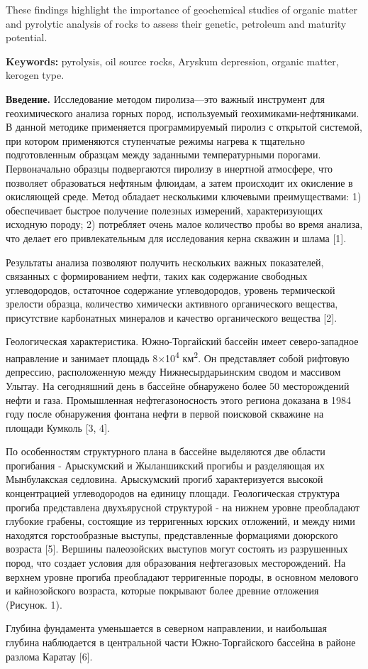 These findings highlight the importance of geochemical studies of
organic matter and pyrolytic analysis of rocks to assess their genetic,
petroleum and maturity potential.

{\bfseries Keywords:} pyrolysis, oil source rocks, Aryskum depression,
organic matter, kerogen type.

\begin{multicols}{2}
{\bfseries Введение.} Исследование методом пиролиза---это важный инструмент
для геохимического анализа горных пород, используемый
геохимиками-нефтяниками. В данной методике применяется программируемый
пиролиз с открытой системой, при котором применяются ступенчатые режимы
нагрева к тщательно подготовленным образцам между заданными
температурными порогами. Первоначально образцы подвергаются пиролизу в
инертной атмосфере, что позволяет образоваться нефтяным флюидам, а затем
происходит их окисление в окисляющей среде. Метод обладает несколькими
ключевыми преимуществами: 1) обеспечивает быстрое получение полезных
измерений, характеризующих исходную породу; 2) потребляет очень малое
количество пробы во время анализа, что делает его привлекательным для
исследования керна скважин и шлама {[}1{]}.

Результаты анализа позволяют получить нескольких важных показателей,
связанных с формированием нефти, таких как содержание свободных
углеводородов, остаточное содержание углеводородов, уровень термической
зрелости образца, количество химически активного органического вещества,
присутствие карбонатных минералов и качество органического вещества
{[}2{]}.

Геологическая характеристика. Южно-Торгайский бассейн имеет
северо-западное направление и занимает площадь 8×10\textsuperscript{4}
км\textsuperscript{2}. Он представляет собой рифтовую депрессию,
расположенную между Нижнесырдарьинским сводом и массивом Улытау. На
сегодняшний день в бассейне обнаружено более 50 месторождений нефти и
газа. Промышленная нефтегазоносность этого региона доказана в 1984 году
после обнаружения фонтана нефти в первой поисковой скважине на площади
Кумколь {[}3, 4{]}.

По особенностям структурного плана в бассейне выделяются две области
прогибания - Арыскумский и Жыланшикский прогибы и разделяющая их
Мынбулакская седловина. Арыскумский прогиб характеризуется высокой
концентрацией углеводородов на единицу площади. Геологическая структура
прогиба представлена двухъярусной структурой - на нижнем уровне
преобладают глубокие грабены, состоящие из терригенных юрских отложений,
и между ними находятся горстообразные выступы, представленные формациями
доюрского возраста {[}5{]}. Вершины палеозойских выступов могут состоять
из разрушенных пород, что создает условия для образования нефтегазовых
месторождений. На верхнем уровне прогиба преобладают терригенные породы,
в основном мелового и кайнозойского возраста, которые покрывают более
древние отложения (Рисунок. 1).

Глубина фундамента уменьшается в северном направлении, и наибольшая
глубина наблюдается в центральной части Южно-Торгайского бассейна в
районе разлома Каратау {[}6{]}.
\end{multicols}

